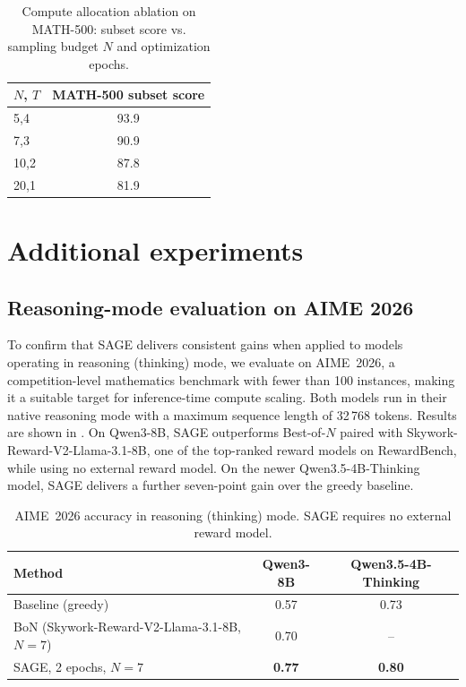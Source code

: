 \documentclass[11pt]{article}
\theoremstyle{plain}
\theoremstyle{definition}
\theoremstyle{remark}
\newcommand{\method}{SAGE}
\begin{document}
\begin{table}[h]
\centering
\begin{small}
\begin{sc}
\begin{tabular}{lc}
\toprule
\textbf{$N$, $T$} & \textbf{MATH-500 subset score} \\
\midrule
5,4 & 93.9 \\
7,3 & 90.9 \\
10,2 & 87.8 \\
20,1 & 81.9 \\
\bottomrule
\end{tabular}
\end{sc}
\end{small}
\caption{Compute allocation ablation on MATH-500: subset score vs. sampling budget \(N\) and optimization epochs.}
\label{tab:ablation-N-epochs}
\end{table}

\section{Additional experiments}
\label{app:additional-experiments}

\subsection{Reasoning-mode evaluation on AIME 2026}

To confirm that \method{} delivers consistent gains when applied to models operating in reasoning (thinking) mode, we evaluate on AIME~2026, a competition-level mathematics benchmark with fewer than 100 instances, making it a suitable target for inference-time compute scaling. Both models run in their native reasoning mode with a maximum sequence length of 32\,768 tokens. Results are shown in . On Qwen3-8B, \method{} outperforms Best-of-\(N\) paired with Skywork-Reward-V2-Llama-3.1-8B, one of the top-ranked reward models on RewardBench, while using no external reward model. On the newer Qwen3.5-4B-Thinking model, \method{} delivers a further seven-point gain over the greedy baseline.

\begin{table}[h]
\centering
\begin{small}
\begin{sc}
\begin{tabular}{lcc}
\toprule
\textbf{Method} & \textbf{Qwen3-8B} & \textbf{Qwen3.5-4B-Thinking} \\
\midrule
Baseline (greedy) & 0.57 & 0.73 \\
BoN (Skywork-Reward-V2-Llama-3.1-8B, $N=7$) & 0.70 & -- \\
\method{}, 2 epochs, $N=7$ & \textbf{0.77} & \textbf{0.80} \\
\bottomrule
\end{tabular}
\end{sc}
\end{small}
\caption{AIME~2026 accuracy in reasoning (thinking) mode. \method{} requires no external reward model.}
\label{tab:aime2026}
\end{table}
\end{document}
